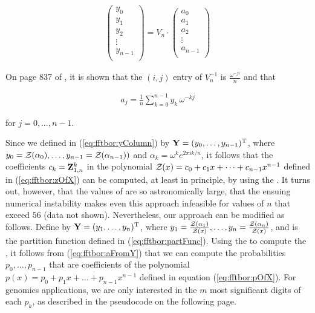 \begin{align}
\label{eq:fftbor:dftMatrix}
\left(
\begin{array}{l}
y_0 \\
y_1 \\
y_2 \\
\vdots \\
y_{n-1} \\
\end{array}
\right)
= V_n \cdot
\left(
\begin{array}{l}
a_0 \\
a_1 \\
a_2 \\
\vdots \\
a_{n-1} \\
\end{array}
\right)
\end{align}

On page 837 of \cite{cormen}, it is shown that the
$(i,j)$ entry of $V_n^{-1}$ is $\frac{\omega^{-j i}}{n}$
and that

\begin{align}
\label{eq:fftbor:aFromY}
a_j = \frac{1}{n} \sum_{k=0}^{n-1} y_k\,\omega^{-kj}
\end{align}

for $j=0,\dots,n-1$.

Since we defined \bfY in (\ref{eq:fftbor:yColumn}) by ${\bf Y} =
(y_0,\dots,y_{n-1})^{\text T}$, where
$y_0={\mathcal Z}_{}(\alpha_0),\dots,y_{n-1}={\mathcal Z}_{}(\alpha_{n-1}))$
and $\alpha_k = \omega^k e^{2 \pi i k/n}$, it follows that the coefficients
$c_k={\bf Z}^{k}_{1,n}$ in the polynomial
${\mathcal Z}_{}(x) = c_0 + c_1 x + \dots + c_{n-1} x^{n-1}$ defined in
(\ref{eq:fftbor:zOfX}) can be computed, at least in principle,
by using the \fft. It turns out, however, that the values of
 are so astronomically large, that the ensuing numerical
instability makes even this approach infeasible for values of $n$
that exceed $56$ (data not shown).
Nevertheless, our approach can be modified as follows.
Define \bfY by ${\bf Y} = (y_1,\dots,y_n)^{\text T}$, where
$y_1=\frac{{\mathcal Z}_{}(\alpha_1)}{{\mathcal Z}_{}(x)},\dots,
y_{n}=\frac{{\mathcal Z}_{}(\alpha_n)}{{\mathcal Z}_{}(x)}$, and
\bfZ{}{} is the partition function defined in (\ref{eq:fftbor:partFunc}).
Using the \fft to compute the \idft, it follows from
(\ref{eq:fftbor:aFromY}) that we can compute the probabilities $p_0,\dots,p_{n-1}$
that are coefficients of the polynomial
$p(x) = p_0 + p_1 x + \dots + p_{n-1}x^{n-1}$
defined in equation (\ref{eq:fftbor:pOfX}). For genomics applications, we are
only interested in the $m$ most significant digits of each $p_k$, as described
in the pseudocode on the following page.

